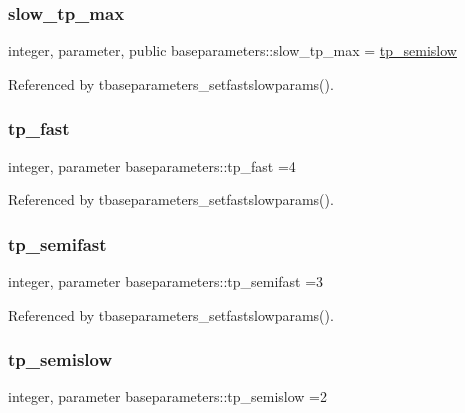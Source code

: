 \subsubsection{\texorpdfstring{slow\+\_\+tp\+\_\+max}{slow\_tp\_max}}
{\footnotesize\ttfamily integer, parameter, public baseparameters\+::slow\+\_\+tp\+\_\+max = \mbox{\hyperlink{namespacebaseparameters_a213e8b067e9d21216fbad3fbd98ec933}{tp\+\_\+semislow}}}



Referenced by tbaseparameters\+\_\+setfastslowparams().

\mbox{\label{namespacebaseparameters_ac1f704b0992c1c1c9f90d320ae0c4f4b}} 
\subsubsection{\texorpdfstring{tp\+\_\+fast}{tp\_fast}}
{\footnotesize\ttfamily integer, parameter baseparameters\+::tp\+\_\+fast =4\hspace{0.3cm}{\ttfamily [private]}}



Referenced by tbaseparameters\+\_\+setfastslowparams().

\mbox{\label{namespacebaseparameters_a4cae4f2dfd7f3b1ed425daca03b67139}} 
\subsubsection{\texorpdfstring{tp\+\_\+semifast}{tp\_semifast}}
{\footnotesize\ttfamily integer, parameter baseparameters\+::tp\+\_\+semifast =3\hspace{0.3cm}{\ttfamily [private]}}



Referenced by tbaseparameters\+\_\+setfastslowparams().

\mbox{\label{namespacebaseparameters_a213e8b067e9d21216fbad3fbd98ec933}} 
\subsubsection{\texorpdfstring{tp\+\_\+semislow}{tp\_semislow}}
{\footnotesize\ttfamily integer, parameter baseparameters\+::tp\+\_\+semislow =2\hspace{0.3cm}{\ttfamily [private]}}



